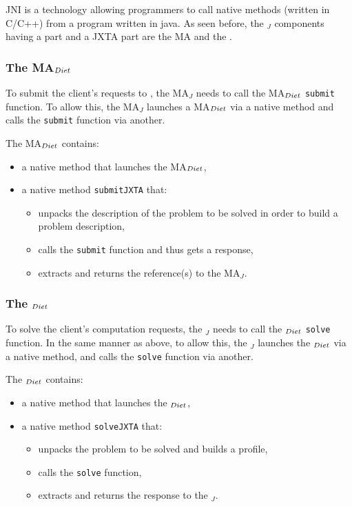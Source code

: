 JNI is a technology allowing programmers to call native methods
(written in C/C++) from a program written in java. As seen before, the
\diet$_{J}$ components having a \diet part and a JXTA part are the MA
and the \sed.

\subsubsection{The MA$_{{\sc Diet}}$}
\label{sssec:jnima}

To submit the client's requests to \diet, the MA$_{J}$ needs to call
the MA$_{{\sc Diet}}$  \texttt{submit} function. To allow this, the MA$_{J}$
launches a MA$_{{\sc Diet}}$ via a native method and calls the
\texttt{submit} function via another.

The MA$_{{\sc Diet}}$ contains:

\begin{itemize}
\item{a native method that launches the MA$_{{\sc Diet}}$,}
\item{a native method \texttt{submitJXTA} that:}
\begin{itemize}
\item{unpacks the description of the problem to be solved in order to
    build a \diet problem description,}
\item{calls the \diet \texttt{submit} function and thus gets a
    response,}
\item{extracts and returns the \sed reference(s) to the MA$_{J}$.}
  \end{itemize}
\end{itemize}

\subsubsection{The \sed$_{{\sc Diet}}$}
\label{sssec:jnised}

To solve the client's computation requests, the \sed$_{J}$ needs to
call the \sed$_{{\sc Diet}}$ \texttt{solve} function. In the same manner as
above, to allow this, the \sed$_{J}$ launches the \sed$_{{\sc Diet}}$ via a
native method, and calls the \texttt{solve} function via another.

The \sed$_{{\sc Diet}}$ contains:

\begin{itemize}
\item{a native method that launches the \sed$_{{\sc Diet}}$,}
\item{a native method \texttt{solveJXTA} that:}
        \begin{itemize}
        \item{unpacks the problem to be solved and builds a \diet
            profile,}
        \item{calls the \texttt{solve} function,}
        \item{extracts and returns the response to the \sed$_{J}$.}
        \end{itemize}
\end{itemize}

